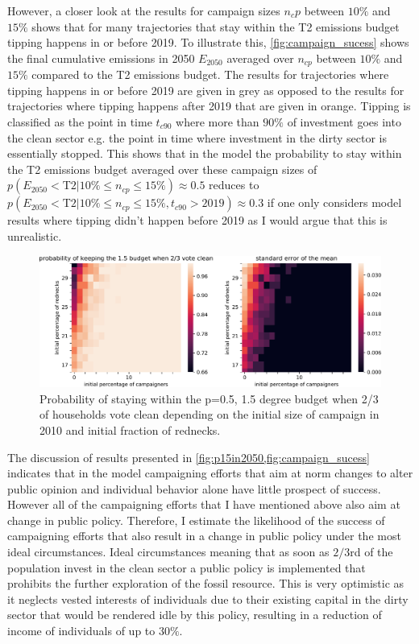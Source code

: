 However, a closer look at the results for campaign sizes $n_cp$ between $10\%$ and $15\%$ shows that for many trajectories that stay within the T2 emissions budget tipping happens in or before 2019. To illustrate this, \cref{fig:campaign_sucess} shows the final cumulative emissions in 2050 $E_{2050}$ averaged over $n_{cp}$ between $10\%$ and $15\%$ compared to the T2 emissions budget. The results for trajectories where tipping happens in or before 2019 are given in grey as opposed to the results for trajectories where tipping happens after 2019 that are given in orange. Tipping is classified as the point in time $t_{c90}$ where more than $90\%$ of investment goes into the clean sector e.g. the point in time where investment in the dirty sector is essentially stopped. This shows that in the model the probability to stay within the T2 emissions budget averaged over these campaign sizes of $p(E_{2050}<\mathrm{T2}|10\% \leq n_{cp} \leq 15\%) \approx 0.5$ reduces to $p(E_{2050}<\mathrm{T2}|10\% \leq n_{cp} \leq 15\%, t_{c90}>2019) \approx 0.3$ if one only considers model results where tipping didn't happen before 2019 as I would argue that this is unrealistic.

\begin{figure}[t]
    \centering
    \includegraphics[width = \textwidth]{figures/p_budget15p66_at_campaign_success.pdf}
    \caption{Probability of staying within the p=0.5, 1.5 degree budget when 2/3 of households vote clean depending on the initial size of campaign in 2010 and initial fraction of rednecks.}
    \label{fig:p15sucess}
\end{figure}

The discussion of results presented in \cref{fig:p15in2050,fig:campaign_sucess} indicates that in the model campaigning efforts that aim at norm changes to alter public opinion and individual behavior alone have little prospect of success. However all of the campaigning efforts that I have mentioned above also aim at change in public policy. Therefore, I estimate the likelihood of the success of campaigning efforts that also result in a change in public policy under the most ideal circumstances. Ideal circumstances meaning that as soon as $2/3$rd of the population invest in the clean sector a public policy is implemented that prohibits the further exploration of the fossil resource. This is very optimistic as it neglects vested interests of individuals due to their existing capital in the dirty sector that would be rendered idle by this policy, resulting in a reduction of income of individuals of up to $30\%$.


